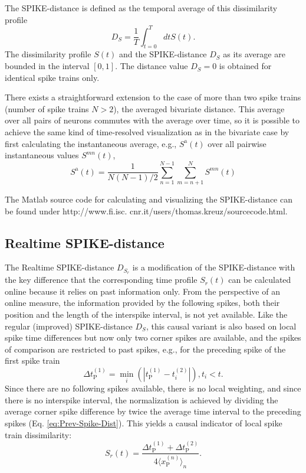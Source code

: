 \documentclass[10pt,twocolumn]{elsart5p}
\begin{document}
The SPIKE-distance is defined as the temporal average of this dissimilarity profile
%
\begin{equation} \label{eq:Bi-Spike-Distances}
    D_S = \frac{1}{T} \int_{t=0}^T dt S (t).
\end{equation}
%
The dissimilarity profile $S (t)$ and the SPIKE-distance $D_S$ as its average are bounded in the interval $[0, 1]$. The distance value $D_S = 0$ is obtained for identical spike trains only.

There exists a straightforward extension to the case of more than two spike trains (number of spike trains $N > 2$), the averaged bivariate distance. This average over all pairs of neurons commutes with the average over time, so it is possible to achieve the same kind of time-resolved visualization as in the bivariate case by first calculating the instantaneous average, e.g., $S^{\mathrm {a}} (t)$ over all pairwise instantaneous values $S^{mn} (t)$,
%
\begin{equation} \label{eq:Bivariate-Average}
    S^{\mathrm {a}} (t) = \frac{1}{N(N-1)/2}\sum_{n=1}^{N-1} \sum_{m=n+1}^N S^{mn} (t)
\end{equation}

The Matlab source code for calculating and visualizing the SPIKE-distance can be found under http://www.fi.isc. cnr.it/users/thomas.kreuz/sourcecode.html.


\subsection{\label{ss:Real-time-Spike-Distance} Realtime SPIKE-distance}

The Realtime SPIKE-distance $D_{S_r}$ is a modification of the SPIKE-distance with the key difference that the corresponding
time profile $S_r(t)$ can be calculated online because it relies on past information only. From the perspective of an online measure, the information provided by the following spikes, both their position and the length of the interspike interval, is not yet available. Like the regular (improved) SPIKE-distance $D_S$, this causal variant is also based on local spike time differences but now only two corner spikes are available, and the spikes of comparison are restricted to past spikes, e.g., for the preceding spike of the first spike train
%
\begin{equation} \label{eq:Delta-Corner-Spike-Realtime}
     \Delta t_{\mathrm {P}}^{(1)} = \min_i (| t_{\mathrm {P}}^{(1)} - t_i^{(2)} |), t_i < t.
\end{equation}
%
Since there are no following spikes available, there is no local weighting, and since there is no interspike interval, the normalization is achieved by dividing the average corner spike difference by twice the average time interval to the preceding spikes (Eq. \ref{eq:Prev-Spike-Dist}). This yields a causal indicator of local spike train dissimilarity:
%
\begin{equation} \label{eq:Bi-Spike-Diss-RT}
    S_r (t) = \frac{ \Delta t_{\mathrm {P}}^{(1)} + \Delta t_{\mathrm {P}}^{(2)}} {4 \langle x_{\mathrm {P}}^{(n)} \rangle_n}.
\end{equation}
\end{document}
